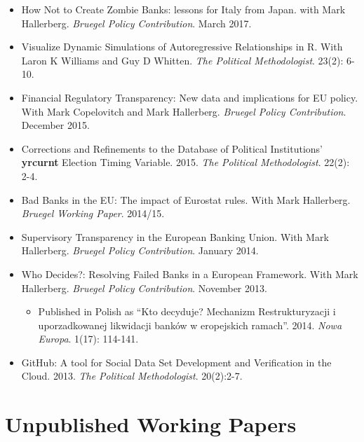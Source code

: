 \documentclass[a4paper]{article}
\begin{document}
\begin{itemize}

    \item How Not to Create Zombie Banks: lessons for Italy from Japan. with Mark Hallerberg. \emph{Bruegel Policy Contribution}. March 2017.

    \item Visualize Dynamic Simulations of Autoregressive Relationships in R. With Laron K Williams and Guy D Whitten. \emph{The Political Methodologist}. 23(2): 6-10.

    \item Financial Regulatory Transparency: New data and implications for EU policy. With Mark Copelovitch and Mark Hallerberg. \emph{Bruegel Policy Contribution}. December 2015.

    \item Corrections and Refinements to the Database of Political Institutions' \textbf{yrcurnt} Election Timing Variable. 2015. {\emph{The Political Methodologist}}. 22(2): 2-4.

    \item Bad Banks in the EU: The impact of Eurostat rules. With Mark Hallerberg. \emph{Bruegel Working Paper}. 2014/15.

    \item Supervisory Transparency in the European Banking Union. With Mark Hallerberg. {\emph{Bruegel Policy Contribution}}. January 2014.

    \item Who Decides?: Resolving Failed Banks in a European Framework. With Mark Hallerberg. {\emph{Bruegel Policy Contribution}}. November 2013.

      \begin{itemize}
        \item Published in Polish as ``Kto decyduje? Mechanizm Restrukturyzacji i uporzadkowanej likwidacji bank\'{o}w w eropejskich ramach''. 2014. \emph{Nowa Europa}. 1(17): 114-141.
      \end{itemize}

    \item GitHub: A tool for Social Data Set Development and Verification in the Cloud. 2013. {\emph{The Political Methodologist}}. 20(2):2-7.

\end{itemize}


\section*{Unpublished Working Papers}
\end{document}
